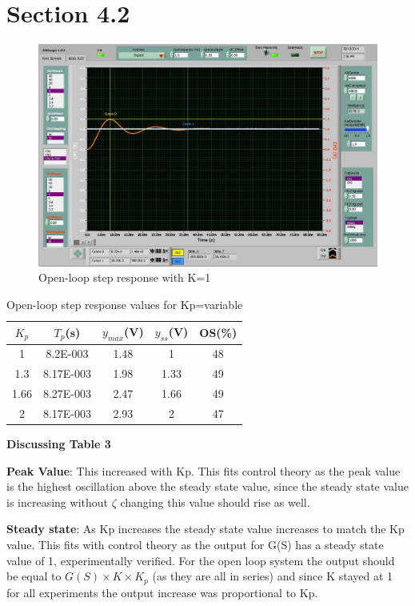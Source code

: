 \documentclass{article}
\begin{document}
\section*{Section 4.2} %
\label{sec:section_4_2}
\begin{figure}[!htbp]
\centering
\includegraphics[width=7in]{4_2.jpg}
\caption{Open-loop step response with K=1}
\end{figure}
\begin{table}[!htbp]
\centering
    \begin{tabular}{|c|c|c|c|c|}
        \hline
        $K_p$ & $T_p$(s) & $y_{max}$(V) & $y_{ss}$(V) & OS(\%)\\
        \hline
        1 &8.2E-003 & 1.48 & 1 & 48\\
        \hline
        1.3 & 8.17E-003 & 1.98 & 1.33 & 49\\
        \hline
        1.66 & 8.27E-003 & 2.47 & 1.66 & 49\\
        \hline
        2 &8.17E-003 & 2.93 & 2 & 47\\
        \hline
    \end{tabular}
    \caption{Open-loop step response values for Kp=variable}
\end{table}
\newpage

\textbf{Discussing Table 3}

\textbf{Peak Value}: This increased with Kp. This fits control theory as the peak value is the highest oscillation above the steady state value, since the steady state value is increasing without $\zeta$ changing this value should rise as well.

\textbf{Steady state}: As Kp increases the steady state value increases to match the Kp value. This fits with control theory as the output for G(S) has a steady state value of 1, experimentally verified. For the open loop system the output should be equal to $G(S)\times K\times K_p$ (as they are all in series) and since K stayed at 1 for all experiments the output increase was proportional to Kp.
\end{document}
